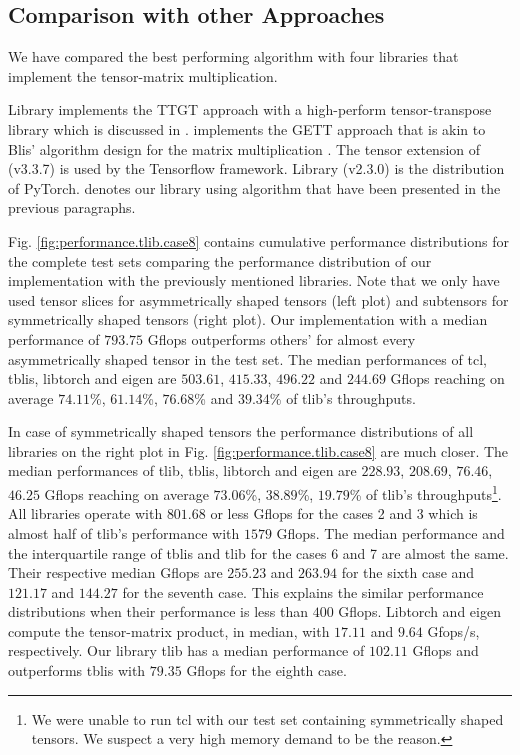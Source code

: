 \subsection{Comparison with other Approaches}
We have compared the best performing algorithm with four libraries that implement the tensor-matrix multiplication.

Library  implements the TTGT approach with a high-perform tensor-transpose library  which is discussed in \cite{springer:2018:design}.
 implements the GETT approach that is akin to Blis' algorithm design for the matrix multiplication \cite{matthews:2018:high}.
The tensor extension of  (v3.3.7) is used by the Tensorflow framework.
Library  (v2.3.0) is the  distribution of PyTorch.
 denotes our library using algorithm  that have been presented in the previous paragraphs.

Fig. \ref{fig:performance.tlib.case8} contains cumulative performance distributions for the complete test sets comparing the performance distribution of our implementation with the previously mentioned libraries.
Note that we only have used tensor slices for asymmetrically shaped tensors (left plot) and subtensors for symmetrically shaped tensors (right plot).
Our implementation with a median performance of $793.75$ Gflops outperforms others' for almost every asymmetrically shaped tensor in the test set.
The median performances of tcl, tblis, libtorch and eigen are $503.61$, $415.33$, $496.22$ and $244.69$ Gflops reaching on average $74.11$\%, $61.14$\%, $76.68$\% and $39.34$\% of tlib's throughputs.

In case of symmetrically shaped tensors the performance distributions of all libraries on the right plot in Fig. \ref{fig:performance.tlib.case8} are much closer.
The median performances of tlib, tblis, libtorch and eigen are $228.93$, $208.69$, $76.46$, $46.25$ Gflops reaching on average $73.06$\%, $38.89$\%, $19.79$\% of tlib's throughputs\footnote{We were unable to run tcl with our test set containing symmetrically shaped tensors. We suspect a very high memory demand to be the reason.}.
All libraries operate with $801.68$ or less Gflops for the cases 2 and 3 which is almost half of tlib's performance with $1579$ Gflops.
The median performance and the interquartile range of tblis and tlib for the cases 6 and 7 are almost the same.
Their respective median Gflops are $255.23$ and $263.94$ for the sixth case and $121.17$ and $144.27$ for the seventh case.
This explains the similar performance distributions when their performance is less than $400$ Gflops.
Libtorch and eigen compute the tensor-matrix product, in median, with $17.11$ and $9.64$ Gfops/s, respectively.
Our library tlib has a median performance of $102.11$ Gflops and outperforms tblis with $79.35$ Gflops for the eighth case.


